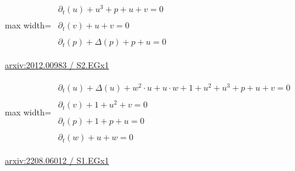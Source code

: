 \documentclass[10pt,a4paper]{article}
\begin{document}
\begin{minipage}{\linewidth}
\begin{center}\begin{adjustbox}{max width=\linewidth}$\displaystyle\begin{gathered}\begin{gathered}\partial_{t}(u)+u^{3}+p+u+v=0\end{gathered}\\[5pt]\begin{gathered}\partial_{t}(v)+u+v=0\end{gathered}\\[5pt]\begin{gathered}\partial_{t}(p)+\Delta(p)+p+u=0\end{gathered}\end{gathered}$\end{adjustbox}\end{center}
{\small \href{https://arxiv.org/html/2012.00983#S2.EGx1}{arxiv:2012.00983 / S2.EGx1}}\par
\end{minipage}\par\vspace{7mm}

\begin{minipage}{\linewidth}
\begin{center}\begin{adjustbox}{max width=\linewidth}$\displaystyle\begin{gathered}\begin{gathered}\partial_{t}(u)+\Delta(u)+w^{2}\cdot u+u\cdot w+1+u^{2}+u^{3}+p+u+v=0\end{gathered}\\[5pt]\begin{gathered}\partial_{t}(v)+1+u^{2}+v=0\end{gathered}\\[5pt]\begin{gathered}\partial_{t}(p)+1+p+u=0\end{gathered}\\[5pt]\begin{gathered}\partial_{t}(w)+u+w=0\end{gathered}\end{gathered}$\end{adjustbox}\end{center}
{\small \href{https://arxiv.org/html/2208.06012#S1.EGx1}{arxiv:2208.06012 / S1.EGx1}}\par
\end{minipage}\par\vspace{7mm}
\end{document}

